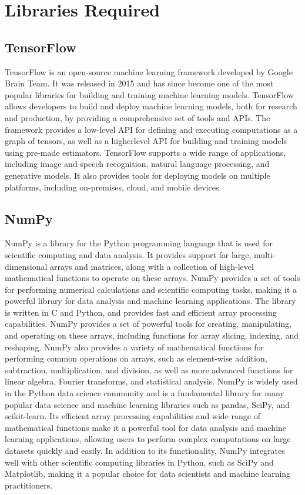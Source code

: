 \section{Libraries Required}
\subsection{TensorFlow}
TensorFlow is an open-source machine learning framework developed by Google Brain 
Team. It was released in 2015 and has since become one of the most popular libraries 
for building and training machine learning models. TensorFlow allows developers to 
build and deploy machine learning models, both for research and production, by 
providing a comprehensive set of tools and APIs. The framework provides a low-level API for defining and executing computations as a graph of tensors, as well as a 
higherlevel API for building and training models using pre-made estimators. 
TensorFlow supports a wide range of applications, including image and speech 
recognition, natural language processing, and generative models. It also provides tools 
for deploying models on multiple platforms, including on-premises, cloud, and mobile 
devices.
\subsection{NumPy}
NumPy is a library for the Python programming language that is used for scientific 
computing and data analysis. It provides support for large, multi-dimensional arrays 
and matrices, along with a collection of high-level mathematical functions to operate 
on these arrays. NumPy provides a set of tools for performing numerical calculations 
and scientific computing tasks, making it a powerful library for data analysis and 
machine learning applications. The library is written in C and Python, and provides fast 
and efficient array processing capabilities.
NumPy provides a set of powerful tools for creating, manipulating, and operating on 
these arrays, including functions for array slicing, indexing, and reshaping. NumPy also 
provides a variety of mathematical functions for performing common operations on 
arrays, such as element-wise addition, subtraction, multiplication, and division, as well as more advanced functions for linear algebra, Fourier transforms, and statistical 
analysis. NumPy is widely used in the Python data science community and is a 
fundamental library for many popular data science and machine learning libraries such 
as pandas, SciPy, and scikit-learn. Its efficient array processing capabilities and wide 
range of mathematical functions make it a powerful tool for data analysis and machine 
learning applications, allowing users to perform complex computations on large 
datasets quickly and easily. In addition to its functionality, NumPy integrates well with 
other scientific computing libraries in Python, such as SciPy and Matplotlib, making it 
a popular choice for data scientists and machine learning practitioners.
